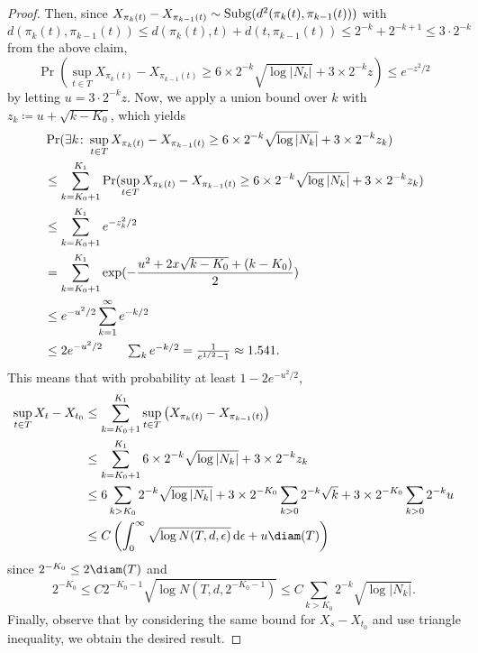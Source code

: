 \begin{proof}
	Then, since \(X_{\pi _k(t)} - X_{\pi _{k-1}(t)} \sim \operatorname{Subg}(d^2(\pi _k(t), \pi _{k-1}(t)))\) with
	\[
		d(\pi _k(t), \pi _{k-1}(t))
		\leq d(\pi _k(t), t) + d(t, \pi _{k-1}(t))
		\leq 2^{-k} + 2^{-k+1}
		\leq 3\cdot 2^{-k}
	\]
	from the above claim,
	\[
		\Pr(\sup _{t\in T} X_{\pi _k(t)} - X_{\pi _{k-1}(t)} \geq 6 \times 2^{-k} \sqrt{\log \vert N_k \vert } + 3 \times 2^{-k} z ) \leq e^{-z^2 / 2}
	\]
	by letting \(u = 3\cdot 2^{-k} z\). Now, we apply a union bound over \(k\) with \(z_k \coloneqq u + \sqrt{k - K_{0} } \), which yields
	\begin{align*}
		 & \Pr(\exists k \colon \sup _{t\in T} X_{\pi _k(t)} - X_{\pi _{k-1}(t)} \geq 6 \times 2^{-k} \sqrt{\log \vert N_k \vert } + 3 \times 2^{-k} z_k )            \\
		 & \leq \sum_{k=K_0 + 1}^{K_1} \Pr(\sup _{t\in T} X_{\pi _k(t)} - X_{\pi _{k-1}(t)} \geq 6 \times 2^{-k} \sqrt{\log \vert N_k \vert } + 3 \times 2^{-k} z_k ) \\
		 & \leq \sum_{k=K_0 + 1}^{K_1} e^{- z_k^2 / 2}                                                                                                                \\
		 & = \sum_{k=K_0 + 1}^{K_1} \exp (- \frac{u^2 + 2x \sqrt{k - K_0} + (k - K_0)}{2})                                                                            \\
		 & \leq e^{-u^2 / 2} \sum_{k = 1}^{\infty } e^{- k / 2}                                                                                                       \\
		 & \leq 2 e^{-u^2 / 2} \tag*{\(\sum_{k} e^{- k / 2} = \frac{1}{e^{1 / 2} - 1} \approx 1.541\)}.
	\end{align*}
	This means that with probability at least \(1 - 2 e^{-u^2 / 2}\),
	\[
		\begin{split}
			\sup _{t\in T} X_t - X_{t_0}
			 & \leq \sum_{k=K_0 + 1}^{K_1} \sup _{t\in T} \left( X_{\pi _k(t)} - X_{\pi _{k-1}(t)} \right)                                                          \\
			 & \leq \sum_{k=K_0 + 1}^{K_1} 6 \times 2^{-k} \sqrt{\log \vert N_k \vert } + 3 \times 2^{-k} z_k                                                       \\
			 & \leq 6 \sum_{k > K_0} 2^{-k} \sqrt{\log \vert N_k \vert } + 3 \times 2^{-K_0} \sum_{k > 0} 2^{-k} \sqrt{k} + 3 \times 2^{-K_0} \sum_{k > 0} 2^{-k} u \\
			 & \leq C \left( \int_{0}^{\infty} \sqrt{\log N(T, d, \epsilon)}  \,\mathrm{d}\epsilon + u \diam(T) \right)
		\end{split}
	\]
	since \(2^{-K_0} \leq 2 \diam(T) \) and
	\[
		2^{-K_0} \leq C 2^{- K_0 - 1} \sqrt{\log N(T, d, 2^{-K_0 - 1})} \leq C \sum_{k > K_0} 2^{-k} \sqrt{\log \vert N_k \vert } .
	\]
	Finally, observe that by considering the same bound for \(X_s - X_{t_0}\) and use triangle inequality, we obtain the desired result.
\end{proof}

